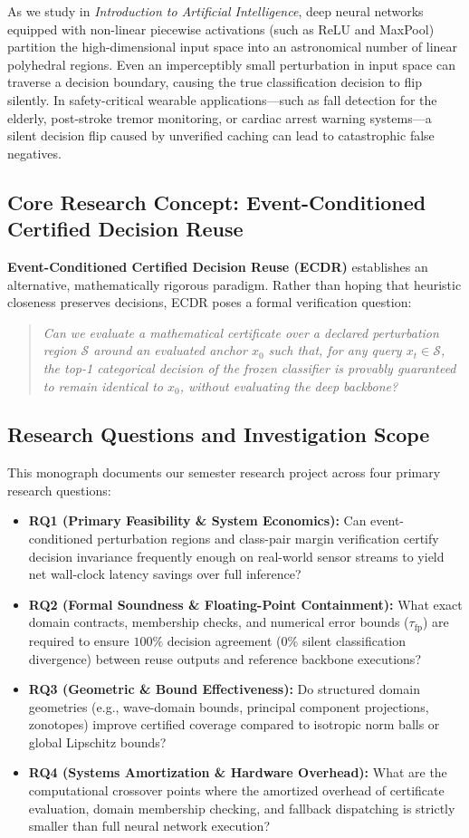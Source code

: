 \documentclass[journal,onecolumn,10pt]{IEEEtran}
\theoremstyle{remark}
\begin{document}
As we study in \textit{Introduction to Artificial Intelligence}, deep neural networks equipped with non-linear piecewise activations (such as ReLU and MaxPool) partition the high-dimensional input space into an astronomical number of linear polyhedral regions. Even an imperceptibly small perturbation in input space can traverse a decision boundary, causing the true classification decision to flip silently. In safety-critical wearable applications---such as fall detection for the elderly, post-stroke tremor monitoring, or cardiac arrest warning systems---a silent decision flip caused by unverified caching can lead to catastrophic false negatives.

\subsection{Core Research Concept: Event-Conditioned Certified Decision Reuse}
\textbf{Event-Conditioned Certified Decision Reuse (ECDR)} establishes an alternative, mathematically rigorous paradigm. Rather than hoping that heuristic closeness preserves decisions, ECDR poses a formal verification question:
\begin{quote}
\textit{Can we evaluate a mathematical certificate over a declared perturbation region $\mathcal{S}$ around an evaluated anchor $x_0$ such that, for any query $x_t \in \mathcal{S}$, the top-1 categorical decision of the frozen classifier is provably guaranteed to remain identical to $x_0$, without evaluating the deep backbone?}
\end{quote}

\subsection{Research Questions and Investigation Scope}
This monograph documents our semester research project across four primary research questions:
\begin{itemize}[leftmargin=1.4em]
  \item \textbf{RQ1 (Primary Feasibility \& System Economics):} Can event-conditioned perturbation regions and class-pair margin verification certify decision invariance frequently enough on real-world sensor streams to yield net wall-clock latency savings over full inference?
  \item \textbf{RQ2 (Formal Soundness \& Floating-Point Containment):} What exact domain contracts, membership checks, and numerical error bounds ($\tau_{\text{fp}}$) are required to ensure $100\%$ decision agreement ($0\%$ silent classification divergence) between reuse outputs and reference backbone executions?
  \item \textbf{RQ3 (Geometric \& Bound Effectiveness):} Do structured domain geometries (e.g., wave-domain bounds, principal component projections, zonotopes) improve certified coverage compared to isotropic norm balls or global Lipschitz bounds?
  \item \textbf{RQ4 (Systems Amortization \& Hardware Overhead):} What are the computational crossover points where the amortized overhead of certificate evaluation, domain membership checking, and fallback dispatching is strictly smaller than full neural network execution?
\end{itemize}
\end{document}
